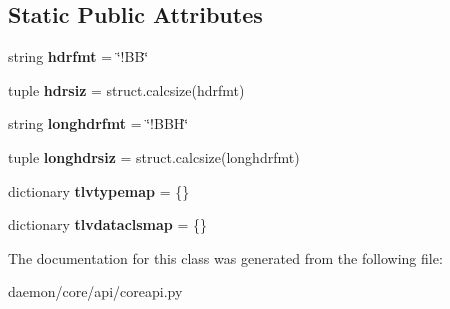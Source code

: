 \subsection*{Static Public Attributes}
\begin{DoxyCompactItemize}
\item 
\hypertarget{classcore_1_1api_1_1coreapi_1_1_core_tlv_a700b38282ffef2d0b48932a723834928}{string {\bfseries hdrfmt} = \char`\"{}!B\+B\char`\"{}}\label{classcore_1_1api_1_1coreapi_1_1_core_tlv_a700b38282ffef2d0b48932a723834928}

\item 
\hypertarget{classcore_1_1api_1_1coreapi_1_1_core_tlv_a256b9ea0312d03e5aaada6097565bdd3}{tuple {\bfseries hdrsiz} = struct.\+calcsize(hdrfmt)}\label{classcore_1_1api_1_1coreapi_1_1_core_tlv_a256b9ea0312d03e5aaada6097565bdd3}

\item 
\hypertarget{classcore_1_1api_1_1coreapi_1_1_core_tlv_a0cfe77a4283dcad187f99f18503edf1a}{string {\bfseries longhdrfmt} = \char`\"{}!B\+B\+H\char`\"{}}\label{classcore_1_1api_1_1coreapi_1_1_core_tlv_a0cfe77a4283dcad187f99f18503edf1a}

\item 
\hypertarget{classcore_1_1api_1_1coreapi_1_1_core_tlv_a67021cbb77a4dcacb92ac2b28ff3eb80}{tuple {\bfseries longhdrsiz} = struct.\+calcsize(longhdrfmt)}\label{classcore_1_1api_1_1coreapi_1_1_core_tlv_a67021cbb77a4dcacb92ac2b28ff3eb80}

\item 
\hypertarget{classcore_1_1api_1_1coreapi_1_1_core_tlv_adcefe48e32705aea0287930049262d6b}{dictionary {\bfseries tlvtypemap} = \{\}}\label{classcore_1_1api_1_1coreapi_1_1_core_tlv_adcefe48e32705aea0287930049262d6b}

\item 
\hypertarget{classcore_1_1api_1_1coreapi_1_1_core_tlv_aef2fc9b3ae984f413c5e76d01615f4c4}{dictionary {\bfseries tlvdataclsmap} = \{\}}\label{classcore_1_1api_1_1coreapi_1_1_core_tlv_aef2fc9b3ae984f413c5e76d01615f4c4}

\end{DoxyCompactItemize}


The documentation for this class was generated from the following file\+:\begin{DoxyCompactItemize}
\item 
daemon/core/api/coreapi.\+py\end{DoxyCompactItemize}
